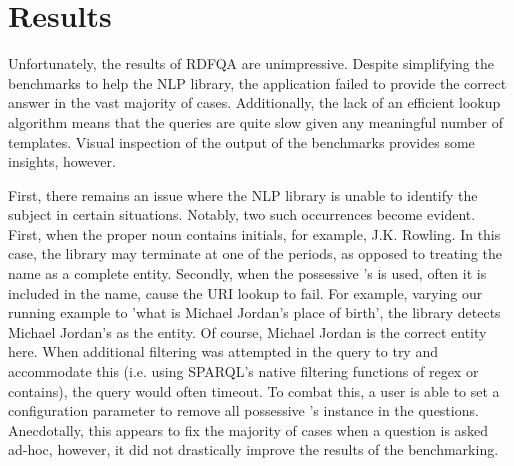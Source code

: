\documentclass[sigplan,screen]{acmart}
\begin{document}
\section{Results}

Unfortunately, the results of RDFQA are unimpressive. Despite simplifying the benchmarks to help the NLP library, the application failed to provide the correct answer in the vast majority of cases. Additionally, the lack of an efficient lookup algorithm means that the queries are quite slow given any meaningful number of templates. Visual inspection of the output of the benchmarks provides some insights, however.

First, there remains an issue where the NLP library is unable to identify the subject in certain situations. Notably, two such occurrences become evident. First, when the proper noun contains initials, for example, J.K. Rowling. In this case, the library may terminate at one of the periods, as opposed to treating the name as a complete entity. Secondly, when the possessive 's is used, often it is included in the name, cause the URI lookup to fail. For example, varying our running example to 'what is Michael Jordan's place of birth', the library detects Michael Jordan's as the entity. Of course, Michael Jordan is the correct entity here. When additional filtering was attempted in the query to try and accommodate this (i.e. using SPARQL's native filtering functions of regex or contains), the query would often timeout. To combat this, a user is able to set a configuration parameter to remove all possessive 's instance in the questions. Anecdotally, this appears to fix the majority of cases when a question is asked ad-hoc, however, it did not drastically improve the results of the benchmarking.
\end{document}
